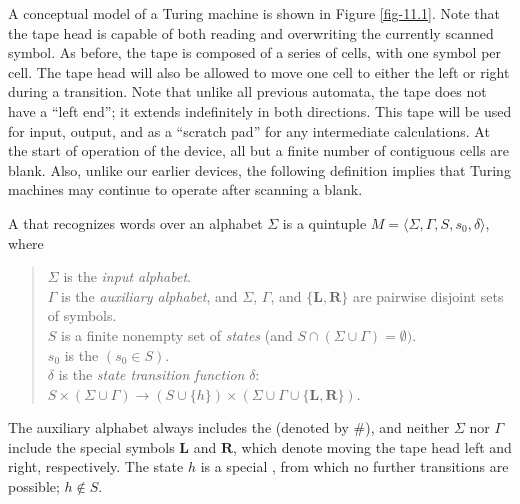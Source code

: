 A conceptual model of a Turing machine is shown in Figure \ref{fig-11.1}.
Note that the tape head is capable of both reading and overwriting
the currently scanned symbol.  As before, the tape is composed of
a series of cells, with one symbol per cell. The tape head will
also be allowed to move one cell to either the left or right during
a transition. Note that unlike all previous automata, the tape does
not have a ``left end''; it extends indefinitely in both directions.
This tape will be used for input, output, and as a ``scratch pad''
for any intermediate calculations. At the start of operation of the
device, all but a finite number of contiguous cells are blank. Also,
unlike our earlier devices, the following definition implies that
Turing machines may continue to operate after scanning a blank.

\begin{dfn}\label{dfn-11.1}
A \emph{} that recognizes words over an alphabet $\Sigma$
is a quintuple $M=\langle\Sigma,\Gamma,S,s_0,\delta\rangle$, where

\begin{quote}
$\Sigma$ is the \emph{input alphabet}. \\
$\Gamma$ is the \emph{auxiliary alphabet}, and $\Sigma$, $\Gamma$,
and $\{\pmb{L},\pmb{R}\}$
	are pairwise disjoint sets of symbols. \\
$S$ is a finite nonempty set of \emph{states} (and $S\cap(\Sigma\cup\Gamma) = 
	\emptyset)$. \\
$s_0$ is the \emph{} $(s_0\in S)$. \\
$\delta$ is the \emph{state transition function} $\delta$: $S\times(\Sigma\cup
	\Gamma)\rightarrow(S\cup\{h\})\times(\Sigma\cup\Gamma\cup\{\pmb{L},\pmb{R}\})$.
\end{quote}
The auxiliary alphabet always includes the \emph{} (denoted by $\#$),
and neither $\Sigma$ nor $\Gamma$ include the special symbols $\pmb{L}$ and
$\pmb{R}$, which denote moving the tape head left and right, respectively. The
state $h$ is a special \emph{}, from which no further transitions are
possible; $h\not \in S$.
\end{dfn}

